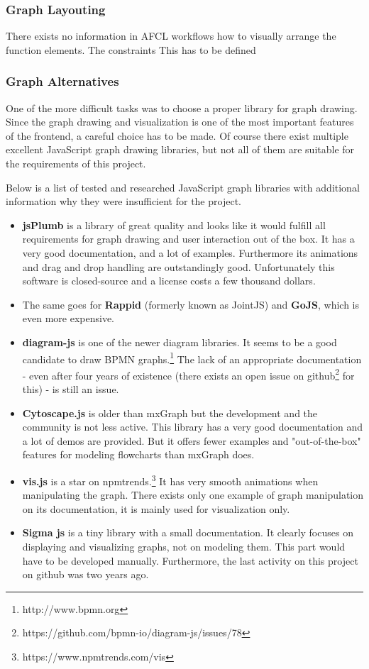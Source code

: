 \documentclass[a4paper,12pt,pdftex,halfparskip,cleardoubleempty,bibtotoc,liststotoc]{scrbook}
\begin{document}

\subsubsection{Graph Layouting}

There exists no information in AFCL workflows how to visually arrange the function elements. The constraints This has to be defined 

\label{sec:graph-alternatives}
\subsubsection{Graph Alternatives}

One of the more difficult tasks was to choose a proper library for graph drawing. Since the graph drawing and visualization is one of the most important features of the frontend, a careful choice has to be made. Of course there exist multiple excellent JavaScript graph drawing libraries, but not all of them are suitable for the requirements of this project.

Below is a list of tested and researched JavaScript graph libraries with additional information why they were insufficient for the project.
\begin{itemize}
	\item \textbf{jsPlumb} is a library of great quality and looks like it would fulfill all  requirements for graph drawing and user interaction out of the box. It has a very good documentation, and a lot of examples. Furthermore its animations and drag and drop handling are outstandingly good. Unfortunately this software is closed-source and a license costs a few thousand dollars.
	\item The same goes for \textbf{Rappid} (formerly known as JointJS) and \textbf{GoJS}, which is even more expensive.
	\item \textbf{diagram-js} is one of the newer diagram libraries. It seems to be a good candidate to draw BPMN graphs.\footnote{http://www.bpmn.org} The lack of an appropriate documentation - even after four years of existence (there exists an open issue on github\footnote{https://github.com/bpmn-io/diagram-js/issues/78} for this) - is still an issue.
	\item \textbf{Cytoscape.js} is older than mxGraph but the development and the community is not less active. This library has a very good documentation and a lot of demos are provided. But it offers fewer examples and "out-of-the-box" features for modeling flowcharts than mxGraph does.
	\item \textbf{vis.js} is a star on npmtrends.\footnote{https://www.npmtrends.com/vis}  It has very smooth animations when manipulating the graph. There exists only one example of graph manipulation on its documentation, it is mainly used for visualization only.
	\item \textbf{Sigma js} is a tiny library with a small documentation. It clearly focuses on displaying and visualizing graphs, not on modeling them. This part would have to be developed manually. Furthermore, the last activity on this project on github was two years ago.
\end{itemize}
\end{document}
